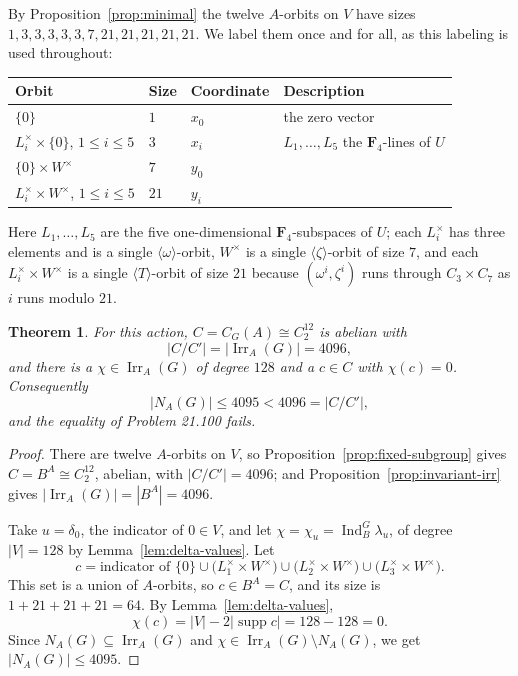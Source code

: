 \documentclass[11pt]{article}
\newtheorem{theorem}{Theorem}[section]
\theoremstyle{definition}
\theoremstyle{remark}
\newcommand{\F}{\mathbf F}
\newcommand{\Irr}{\operatorname{Irr}}
\newcommand{\Ind}{\operatorname{Ind}}
\newcommand{\supp}{\operatorname{supp}}
\begin{document}
By Proposition~\ref{prop:minimal} the twelve $A$-orbits on $V$ have
sizes $1,3,3,3,3,3,7,21,21,21,21,21$.  We label them once and for all,
as this labeling is used throughout:

\begin{center}
\begin{tabular}{@{}llll@{}}
\toprule
Orbit & Size & Coordinate & Description\\
\midrule
$\{0\}$ & $1$ & $x_0$ & the zero vector\\
$L_i^\times\times\{0\}$, $1\le i\le5$ & $3$ & $x_i$
 & $L_1,\dots,L_5$ the $\F_4$-lines of $U$\\
$\{0\}\times W^\times$ & $7$ & $y_0$ &\\
$L_i^\times\times W^\times$, $1\le i\le5$ & $21$ & $y_i$ &\\
\bottomrule
\end{tabular}
\end{center}

Here $L_1,\dots,L_5$ are the five one-dimensional $\F_4$-subspaces of
$U$; each $L_i^\times$ has three elements and is a single
$\langle\omega\rangle$-orbit, $W^\times$ is a single
$\langle\zeta\rangle$-orbit of size $7$, and each
$L_i^\times\times W^\times$ is a single $\langle T\rangle$-orbit of
size $21$ because $(\omega^i,\zeta^i)$ runs through
$C_3\times C_7$ as $i$ runs modulo $21$.

\begin{theorem}\label{thm:counterexample}
For this action, $C=C_G(A)\cong C_2^{12}$ is abelian with
\[
 |C/C'|=|\Irr_A(G)|=4096 ,
\]
and there is a $\chi\in\Irr_A(G)$ of degree $128$ and a $c\in C$ with
$\chi(c)=0$.  Consequently
\[
 |N_A(G)|\le4095<4096=|C/C'| ,
\]
and the equality of Problem 21.100 fails.
\end{theorem}

\begin{proof}
There are twelve $A$-orbits on $V$, so
Proposition~\ref{prop:fixed-subgroup} gives $C=B^A\cong C_2^{12}$,
abelian, with $|C/C'|=4096$; and
Proposition~\ref{prop:invariant-irr} gives $|\Irr_A(G)|=|B^A|=4096$.

Take $u=\delta_0$, the indicator of $0\in V$, and let
$\chi=\chi_u=\Ind_B^G\lambda_u$, of degree $|V|=128$ by
Lemma~\ref{lem:delta-values}.  Let
\[
 c=\text{indicator of }
 \{0\}\cup\bigl(L_1^\times\times W^\times\bigr)
 \cup\bigl(L_2^\times\times W^\times\bigr)
 \cup\bigl(L_3^\times\times W^\times\bigr).
\]
This set is a union of $A$-orbits, so $c\in B^A=C$, and its size is
$1+21+21+21=64$.  By Lemma~\ref{lem:delta-values},
\[
 \chi(c)=|V|-2|\supp c|=128-128=0 .
\]
Since $N_A(G)\subseteq\Irr_A(G)$ and $\chi\in\Irr_A(G)\setminus
N_A(G)$, we get $|N_A(G)|\le4095$.
\end{proof}
\end{document}
